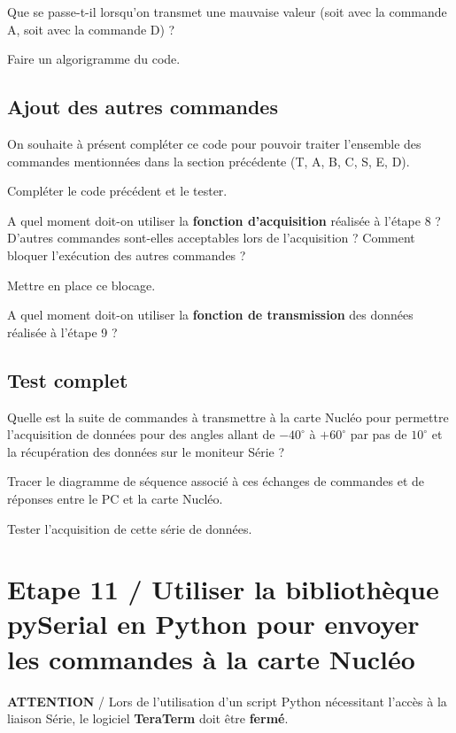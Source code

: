 \documentclass[a4paper,11pt,titlepage]{article} %
\begin{document}
\Quest Que se passe-t-il lorsqu'on transmet une mauvaise valeur (soit avec la commande A, soit avec la commande D) ?

\Quest Faire un algorigramme du code.

\subsection{Ajout des autres commandes}

On souhaite à présent compléter ce code pour pouvoir traiter l'ensemble des commandes mentionnées dans la section précédente (T, A, B, C, S, E, D).

\Manip Compléter le code précédent et le tester.

\Quest A quel moment doit-on utiliser la \textbf{fonction d'acquisition} réalisée à l'étape 8 ? D'autres commandes sont-elles acceptables lors de l'acquisition ? Comment bloquer l'exécution des autres commandes ?

\Manip Mettre en place ce blocage.

\Quest A quel moment doit-on utiliser la \textbf{fonction de transmission} des données réalisée à l'étape 9 ?

\newpage
\subsection{Test complet}

\Quest Quelle est la suite de commandes à transmettre à la carte Nucléo pour permettre l'acquisition de données pour des angles allant de $-40^\circ{}$ à $+60^\circ{}$ par pas de $10^\circ{}$ et la récupération des données sur le moniteur Série ?

\Quest Tracer le diagramme de séquence associé à ces échanges de commandes et de réponses entre le PC et la carte Nucléo.

\Manip Tester l'acquisition de cette série de données.


\section{Etape 11 / Utiliser la bibliothèque pySerial en Python pour envoyer les commandes à la carte Nucléo}


\begin{mdframed}[style=sidebar,frametitle={}]
\large
\textbf{ATTENTION} / Lors de l'utilisation d'un script Python nécessitant l'accès à la liaison Série, le logiciel \textbf{TeraTerm} doit être \textbf{fermé}.
\end{mdframed}
\end{document}
